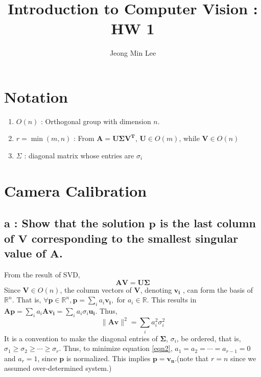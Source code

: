 \documentclass[10pt]{article}
\title{\textbf{Introduction to Computer Vision : HW 1}}
\author{Jeong Min Lee}
\begin{document}
\maketitle
\section*{Notation}
\begin{enumerate}
    \item $O(n)$ : Orthogonal group with dimension $n$.
    \item $r = \min (m,n)$ : From $\mathbf{A = U\Sigma V^T}$, $\mathbf{U} \in O(m)$, while $\mathbf{V} \in O(n)$
    \item $\Sigma$ : diagonal matrix whose entries are $\sigma_i$
\end{enumerate}
\section{Camera Calibration}
\subsection*{a : Show that the solution $\mathbf{p}$ is the last column of $\mathbf{V}$ corresponding to the smallest singular value of $\mathbf{A}$.}
\noindent From the result of SVD, 
\begin{equation}
    \mathbf{AV=U\Sigma}
\end{equation}
Since $\mathbf{V} \in O(n)$, the column vectors of $\mathbf{V}$, denoting $\mathbf{v_i}$ , can form the basis of $\mathbb{R}^n$. That is, $\forall \mathbf{p} \in \mathbb{R}^n, \mathbf{p} = \sum_i a_i \mathbf{v_i},\text{ for } a_i \in \mathbb{R}$.
This results in $\mathbf{Ap} =\sum_i a_i \mathbf{Av_i} = \sum_i a_i\sigma_i \mathbf{u_i}$. Thus,
\begin{equation}
    \lVert \mathbf{Av}\rVert^2 = \sum_i a_i^2\sigma_i^2
    \label{eqn2}
\end{equation}
It is a convention to make the diagonal entries of $\mathbf{\Sigma}$, $\sigma_i$, be ordered, that is, $\sigma_1 \ge \sigma_2 \ge \cdots \ge \sigma_r$.
Thus, to minimize equation \ref{eqn2}, $a_1 = a_2 = \cdots = a_{r-1} = 0$ and $a_r = 1$, since $\mathbf{p}$ is normalized. This implies $\mathbf{p = v_n}$.(note that $r = n$ since we assumed over-determined system.)
\end{document}
